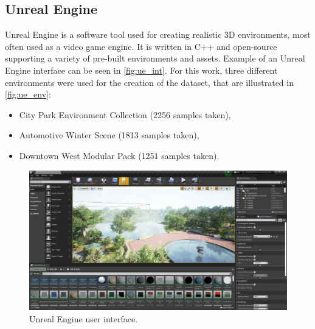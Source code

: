 \documentclass[twoside]{ctuthesis}
\theoremstyle{plain}
\theoremstyle{definition}
\theoremstyle{note}
\begin{document}
\subsection{Unreal Engine}
Unreal Engine is a software tool used for creating realistic 3D environments, most often used as a video game engine. It is written in C++ and open-source supporting a variety of pre-built environments and assets. Example of an Unreal Engine interface can be seen in \autoref{fig:ue_int}. For this work, three different environments were used for the creation of the dataset, that are illustrated in \autoref{fig:ue_env}:
\begin{itemize}
	\item City Park Environment Collection (2256 samples taken),
	\item Automotive Winter Scene (1813 samples taken),
	\item Downtown West Modular Pack (1251 samples taken).
\end{itemize}
\begin{figure}
	\centering
	\includegraphics[width=\textwidth]{unreal_ui.png}
	\caption{Unreal Engine user interface.}
	\label{fig:ue_int}
\end{figure}
\end{document}
